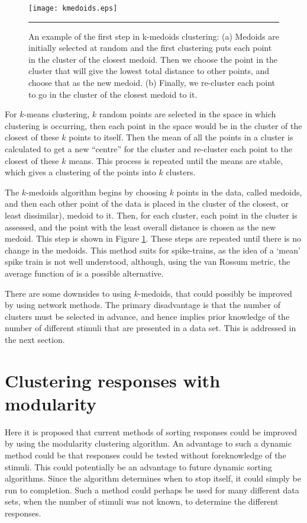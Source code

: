 \begin{figure}[htb]
  \centering
  \texttt{[image: kmedoids.eps]}
  \bigskip
  \rule{33em}{0.5pt}
  \caption{An example of the first step in k-medoids clustering:  (a) Medoids 
    are initially selected at random and the first clustering puts each point 
    in the cluster of the closest medoid. Then we choose the point in the 
    cluster that will give the lowest total distance to other points, and 
    choose that as the new medoid. (b) Finally, we re-cluster each point to go 
    in the cluster of the closest medoid to it.  \label{kmed}}
\end{figure}


For $k$-means clustering, $k$ random points are selected in the space in which 
clustering is occurring, then each point in the space would be in the cluster of 
the closest of these $k$ points to itself.  Then the mean of all 
the points in a cluster is calculated to get a new ``centre'' for the cluster and re-cluster 
each point to the closest of these $k$ means.  This process is repeated until 
the means are stable, which gives a clustering of the points into $k$ clusters.

The $k$-medoids algorithm begins by choosing $k$ points in the data, called medoids, 
and then  each other point of the data is placed in the cluster of the 
closest, or least dissimilar), medoid to it.  Then, for each cluster, 
 each point in the cluster is assessed, and the point with 
the least overall distance is chosen as the new medoid. This step is shown in Figure 
\ref{kmed}. These steps are repeated until there is no change in the 
medoids.  This method suits for spike-trains, as the idea of a `mean'
spike train is not well understood, although, using the van Rossum metric, the average function of \citet{JulienneHoughton2012a} is a possible alternative.

There are some downsides to using $k$-medoids, that could possibly be 
improved by using network methods.  The primary disadvantage is that the number of 
 clusters must be selected in advance, and hence implies prior knowledge of the number of different 
stimuli that are presented in a data set. This is addressed in the next section.

\section{Clustering responses with modularity}

Here it is proposed that current methods of sorting 
responses could be improved by using the modularity clustering algorithm.  An advantage to such 
a dynamic method could be that responses could be tested without foreknowledge of the stimuli.  This could potentially be an advantage to future dynamic sorting algorithms. Since the algorithm determines when to stop itself, it 
could simply be run to completion.  Such a method could perhaps be used for 
many different data sets, when the number of stimuli was not known, to 
determine the different responses.

